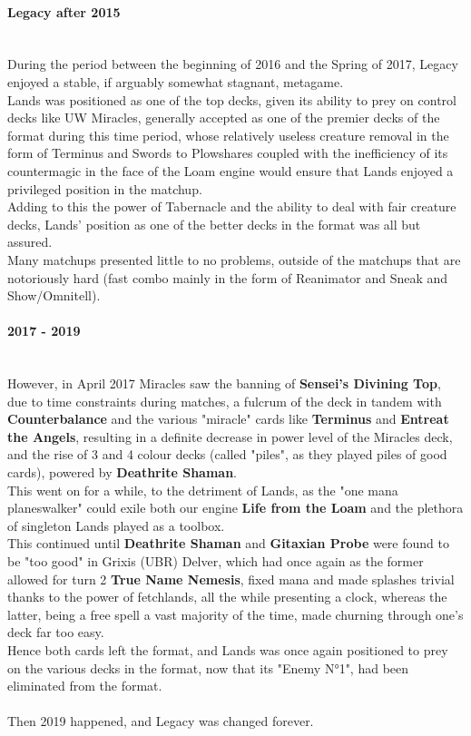 \documentclass{report}
\begin{document}
\paragraph{Legacy after 2015\\\\}
During the period between the beginning of 2016 and the Spring of 2017, Legacy enjoyed a stable, if arguably somewhat stagnant, metagame.\\ Lands was positioned as one of the top decks, given its ability to prey on control decks like  UW Miracles, generally accepted as one of the premier decks of the format during this time period, whose relatively useless creature removal in the form of Terminus and Swords to Plowshares coupled with the inefficiency of its countermagic in the face of the Loam engine would ensure that Lands enjoyed a privileged position in the matchup.\\Adding to this the power of Tabernacle and the ability to deal with fair creature decks, Lands' position as one of the better decks in the format was all but assured.\\ Many matchups presented little to no problems, outside of the matchups that are notoriously hard (fast combo mainly in the form of Reanimator and Sneak and Show/Omnitell).\\
\paragraph{2017 - 2019\\\\}
However, in April 2017 Miracles saw the banning of \textbf{Sensei's Divining Top}, due to time constraints during matches, a fulcrum of the deck in tandem with \textbf{Counterbalance} and the various "miracle" cards like \textbf{Terminus} and \textbf{Entreat the Angels}, resulting in a definite decrease in power level of the Miracles deck, and the rise of 3 and 4 colour decks (called "piles", as they played piles of good cards), powered by \textbf{Deathrite Shaman}.\\ This went on for a while, to the detriment of Lands, as the "one mana planeswalker" could exile both our engine \textbf{Life from the Loam} and the plethora of singleton Lands played as a toolbox. \\
This continued until \textbf{Deathrite Shaman} and \textbf{Gitaxian Probe} were found to be "too good" in Grixis (UBR) Delver, which had once again  as the former allowed for turn 2 \textbf{True Name Nemesis}, fixed mana and made splashes trivial thanks to the power of fetchlands, all the while presenting a clock, whereas the latter, being a free spell a vast majority of the time, made churning through one's deck far too easy.\\ Hence both cards left the format, and Lands was once again positioned to prey on the various decks in the format, now that its "Enemy N°1", had been eliminated from the format.\\\\
Then 2019 happened, and Legacy was changed forever.\\
\newpage
\end{document}

